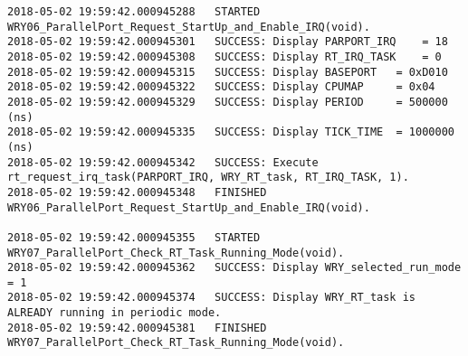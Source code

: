\begin{landscape}
\begin{lstlisting}[caption={C/C++ Code excerpt for Real Time (RTAI)}, label=C/C++-Code-excerpt-for-Real-Time-(RTAI)]
2018-05-02 19:59:42.000945288 	STARTED  WRY06_ParallelPort_Request_StartUp_and_Enable_IRQ(void).
2018-05-02 19:59:42.000945301 	SUCCESS: Display PARPORT_IRQ 	= 18
2018-05-02 19:59:42.000945308 	SUCCESS: Display RT_IRQ_TASK 	= 0
2018-05-02 19:59:42.000945315 	SUCCESS: Display BASEPORT 	= 0xD010
2018-05-02 19:59:42.000945322 	SUCCESS: Display CPUMAP 	= 0x04
2018-05-02 19:59:42.000945329 	SUCCESS: Display PERIOD 	= 500000 (ns)
2018-05-02 19:59:42.000945335 	SUCCESS: Display TICK_TIME 	= 1000000 (ns)
2018-05-02 19:59:42.000945342 	SUCCESS: Execute rt_request_irq_task(PARPORT_IRQ, WRY_RT_task, RT_IRQ_TASK, 1).
2018-05-02 19:59:42.000945348 	FINISHED WRY06_ParallelPort_Request_StartUp_and_Enable_IRQ(void).

2018-05-02 19:59:42.000945355 	STARTED  WRY07_ParallelPort_Check_RT_Task_Running_Mode(void).
2018-05-02 19:59:42.000945362 	SUCCESS: Display WRY_selected_run_mode = 1
2018-05-02 19:59:42.000945374 	SUCCESS: Display WRY_RT_task is ALREADY running in periodic mode.
2018-05-02 19:59:42.000945381 	FINISHED WRY07_ParallelPort_Check_RT_Task_Running_Mode(void).


\end{lstlisting}
\end{landscape}
